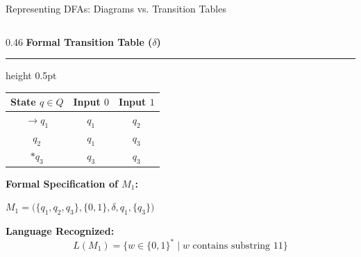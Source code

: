 \documentclass[aspectratio=169, 10pt]{beamer}
\newcommand{\colheader}[1]{%
  {\noindent\footnotesize\bfseries\color{gimpanavy}#1}%
  \vspace{0.02cm}%
  {\color{gimpanavy!30}\hrule height 0.5pt}%
  \vspace{0.05cm}%
}
\newcommand{\greentitle}[1]{{\noindent\footnotesize\bfseries\color{accentGreen}#1}\par\vspace{0.03cm}}
\begin{document}
\begin{frame}{Representing DFAs: Diagrams vs. Transition Tables}
\begin{columns}[T]
    \begin{column}{0.46\textwidth}
      \colheader{Formal Transition Table ($\delta$)}
      \vspace{0.05cm}
      \begin{center}
        \scriptsize
        \renewcommand{\arraystretch}{1.25}
        \begin{tabular}{@{} c | c c @{}}
          \toprule
          \textbf{State} $q \in Q$ & \textbf{Input} $0$ & \textbf{Input} $1$ \\
          \midrule
          $\to q_1$ & $q_1$ & $q_2$ \\
          $q_2$     & $q_1$ & $q_3$ \\
          $* q_3$   & $q_3$ & $q_3$ \\
          \bottomrule
        \end{tabular}
      \end{center}
      \vspace{0.08cm}
      \begin{tcolorbox}[examplecard]
        \greentitle{Formal Specification of $M_1$:}
        {\scriptsize
        $M_1 = \bigl(\{q_1, q_2, q_3\}, \{0, 1\}, \delta, q_1, \{q_3\}\bigr)$\par
        \textbf{Language Recognized:}
        \[ L(M_1) = \{w \in \{0, 1\}^* \mid w \text{ contains substring } 11\} \]
        }
      \end{tcolorbox}
    \end{column}
  \end{columns}
\end{frame}
\end{document}
